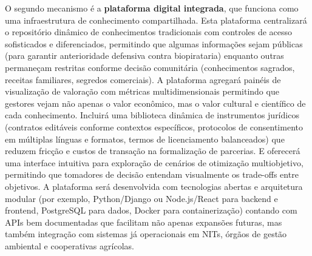 O segundo mecanismo é a \textbf{plataforma digital integrada}, que funciona como uma infraestrutura de conhecimento compartilhada. Esta plataforma centralizará o repositório dinâmico de conhecimentos tradicionais com controles de acesso sofisticados e diferenciados, permitindo que algumas informações sejam públicas (para garantir anterioridade defensiva contra biopirataria) enquanto outras permaneçam restritas conforme decisão comunitária (conhecimentos sagrados, receitas familiares, segredos comerciais). A plataforma agregará painéis de visualização de valoração com métricas multidimensionais permitindo que gestores vejam não apenas o valor econômico, mas o valor cultural e científico de cada conhecimento. Incluirá uma biblioteca dinâmica de instrumentos jurídicos (contratos editáveis conforme contextos específicos, protocolos de consentimento em múltiplas línguas e formatos, termos de licenciamento balanceados) que reduzem fricção e custos de transação na formalização de parcerias. E oferecerá uma interface intuitiva para exploração de cenários de otimização multiobjetivo, permitindo que tomadores de decisão entendam visualmente os trade-offs entre objetivos. A plataforma será desenvolvida com tecnologias abertas e arquitetura modular (por exemplo, Python/Django ou Node.js/React para backend e frontend, PostgreSQL para dados, Docker para containerização) contando com APIs bem documentadas que facilitam não apenas expansões futuras, mas também integração com sistemas já operacionais em NITs, órgãos de gestão ambiental e cooperativas agrícolas.


